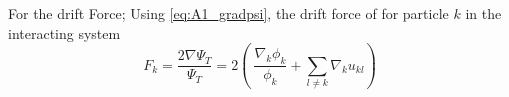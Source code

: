 \documentclass[%
oneside,                 %
final,                   %
10pt]{article}
\begin{document}
\begin{appendices}
For the drift Force;
Using \eqref{eq:A1_gradpsi}, the drift force of for particle $k$ in the interacting system
\begin{equation*}
F_k = \frac{2\nabla \Psi_T}{\Psi_T}= 2 \left(\ \frac{\nabla_k \phi_k}{\phi_k} + \sum_{l\ne k}\nabla_k u_{kl} \right) 
\end{equation*}




\end{appendices}
\end{document}
